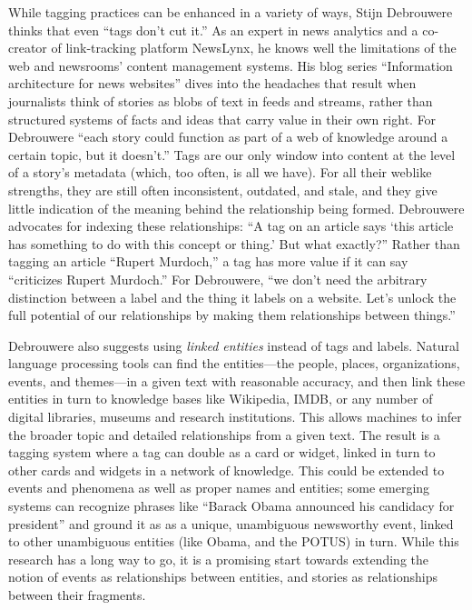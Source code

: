 While tagging practices can be enhanced in a variety of ways, Stijn Debrouwere thinks that even ``tags don't cut it.''\autocite{debrouwere_tags_2010} As an expert in news analytics and a co-creator of link-tracking platform NewsLynx, he knows well the limitations of the web and newsrooms' content management systems. His blog series ``Information architecture for news websites'' dives into the headaches that result when journalists think of stories as blobs of text in feeds and streams, rather than structured systems of facts and ideas that carry value in their own right.\autocite{debrouwere_information_2010} For Debrouwere ``each story could function as part of a web of knowledge around a certain topic, but it doesn't.'' Tags are our only window into content at the level of a story's metadata (which, too often, is all we have). For all their weblike strengths, they are still often inconsistent, outdated, and stale, and they give little indication of the meaning behind the relationship being formed. Debrouwere advocates for indexing these relationships: ``A tag on an article says `this article has something to do with this concept or thing.' But what exactly?'' Rather than tagging an article ``Rupert Murdoch,'' a tag has more value if it can say ``criticizes Rupert Murdoch.'' For Debrouwere, ``we don't need the arbitrary distinction between a label and the thing it labels on a website. Let's unlock the full potential of our relationships by making them relationships between things.''

Debrouwere also suggests using \emph{linked entities} instead of tags and labels. Natural language processing tools can find the entities---the people, places, organizations, events, and themes---in a given text with reasonable accuracy, and then link these entities in turn to knowledge bases like Wikipedia, IMDB, or any number of digital libraries, museums and research institutions. This allows machines to infer the broader topic and detailed relationships from a given text. The result is a tagging system where a tag can double as a card or widget, linked in turn to other cards and widgets in a network of knowledge. This could be extended to events and phenomena as well as proper names and entities; some emerging systems can recognize phrases like ``Barack Obama announced his candidacy for president'' and ground it as as a unique, unambiguous newsworthy event, linked to other unambiguous entities (like Obama, and the POTUS) in turn.\autocite{nothman_grounding_2013} While this research has a long way to go, it is a promising start towards extending the notion of events as relationships between entities, and stories as relationships between their fragments.

